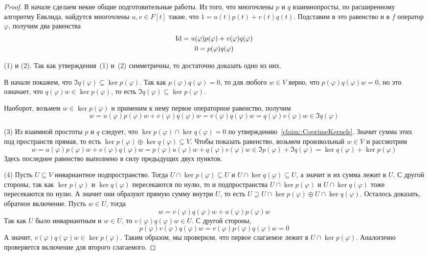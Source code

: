 \begin{proof}
В начале сделаем некие общие подготовительные работы. Из того, что многочлены $p$ и $q$ взаимнопросты, по расширенному алгоритму Евклида, найдутся многочлены $u,v\in F[t]$ такие, что $1 = u(t)p(t) + v(t)q(t)$. Подставим в это равенство и в $f$ оператор $\varphi$, получим два равенства
\begin{gather*}
\operatorname{Id} = u(\varphi) p(\varphi) + v(\varphi) q(\varphi)\\
0 = p(\varphi) q(\varphi)
\end{gather*}

(1) и (2). Так как утверждения~(1) и~(2) симметричны, то достаточно доказать одно из них. 

В начале покажем, что $\Im q(\varphi)\subseteq \ker p(\varphi)$. Так как $p(\varphi)q(\varphi) = 0$, то для любого $w\in V$ верно, что $p(\varphi)q(\varphi)w = 0$, но это означает, что $q(\varphi)w \in\ker p(\varphi)$, то есть $\Im q(\varphi)\subseteq \ker p(\varphi)$.

Наоборот, возьмем $w\in \ker p(\varphi)$ и применим к нему первое операторное равенство, получим
\[
w = u(\varphi) p(\varphi) w + v(\varphi) q(\varphi) w = v(\varphi) q(\varphi) w =   q(\varphi) v(\varphi) w\in \Im q(\varphi)
\]

(3) Из взаимной простоты $p$ и $q$ следует, что $\ker p(\varphi) \cap \ker q(\varphi) = 0$ по утверждению~\ref{claim::CoprimeKernels}. Значит сумма этих под пространств прямая, то есть $\ker p(\varphi) \oplus \ker q(\varphi) \subseteq V$. Чтобы показать равенство, возьмем произвольный $w\in V$ и рассмотрим
\[
w = u(\varphi) p(\varphi) w + v(\varphi) q(\varphi) w = p(\varphi) u(\varphi) w + q(\varphi) v(\varphi) w\in \Im p(\varphi) +\Im q(\varphi) = \ker q(\varphi) + \ker p(\varphi)
\]
Здесь последнее равенство выполнено в силу предыдущих двух пунктов.

(4) Пусть $U\subseteq V$ инвариантное подпространство. Тогда $U\cap \ker p(\varphi) \subseteq U$ и $U\cap \ker q(\varphi) \subseteq U$, а значит и их сумма лежит в $U$. С другой стороны, так как $\ker p(\varphi)$ и $\ker q(\varphi)$ пересекаются по нулю, то и подпространства $U\cap \ker p(\varphi)$ и $U\cap \ker q(\varphi)$ тоже пересекаются по нулю. А значит они образуют прямую сумму внутри $U$, то есть $U \supseteq U\cap \ker p(\varphi) \oplus U \cap \ker q(\varphi)$. Осталось доказать, обратное включение. Пусть $w\in U$, тогда 
\[
w = v(\varphi) q(\varphi) w + u(\varphi) p(\varphi) w
\]
Так как $U$ было инвариантным и  $w\in U$, то $v(\varphi) q(\varphi) w \in U$. С другой стороны,
\[
p(\varphi) v(\varphi) q(\varphi) w = v(\varphi) p(\varphi)  q(\varphi) w = 0
\]
А значит, $v(\varphi) q(\varphi) w\in \ker p(\varphi)$. Таким образом, мы проверили, что первое слагаемое лежит в $U\cap \ker p(\varphi)$. Аналогично проверяется включение для второго слагаемого.


\end{proof}
